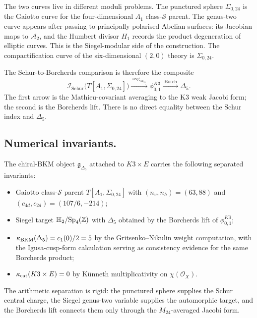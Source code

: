 The two curves live in different moduli problems.  The punctured sphere
$\Sigma_{0,24}$ is the Gaiotto curve for the four-dimensional
$A_1$ class-$\mathcal S$ parent.  The genus-two curve appears after
passing to principally polarised Abelian surfaces: its Jacobian maps to
$\mathcal A_2$, and the Humbert divisor $H_1$ records the product
degeneration of elliptic curves.  This is the Siegel-modular side of
the construction. The compactification curve of the six-dimensional
$(2,0)$ theory is \(\Sigma_{0,24}\).

The Schur-to-Borcherds comparison is therefore the composite
\begin{equation}
  \mathcal I_{\mathrm{Schur}}\big(T[A_1,\Sigma_{0,24}]\big)
  \xrightarrow{\;\operatorname{avg}_{M_{24}}\;}
  \phi^{K3}_{0,1}
  \xrightarrow{\;\mathrm{Borch}\;}
  \Delta_5.
  \label{eq:schur-m24-borcherds-composite}
\end{equation}
The first arrow is the Mathieu-covariant averaging to the K3 weak
Jacobi form; the second is the Borcherds lift.  There is no direct
equality between the Schur index and $\Delta_5$.

\subsection*{Numerical invariants.}

The chiral-BKM object $\mathfrak g_{\Delta_5}$ attached to
$K3\times E$ carries the following separated invariants:
\begin{itemize}\setlength\itemsep{0pt}
  \item Gaiotto class-$\mathcal S$ parent
  $T[A_1,\Sigma_{0,24}]$ with
  $(n_v,n_h)=(63,88)$ and
  $(c_{4d},c_{2d})=(107/6,-214)$;
  \item Siegel target $\mathbb H_2/\mathrm{Sp}_4(\mathbb{Z})$ with
  $\Delta_5$ obtained by the Borcherds lift of $\phi^{K3}_{0,1}$;
  \item $\kappa_{\mathrm{BKM}}(\Delta_5)=c_1(0)/2=5$ by the Gritsenko--Nikulin
  weight computation, with the Igusa-cusp-form calculation serving as
  consistency evidence for the same Borcherds product;
  \item $\kappa_{\mathrm{cat}}(K3\times E)=0$ by K\"unneth multiplicativity on
  $\chi(\mathcal O_X)$.
\end{itemize}

The arithmetic separation is rigid: the punctured sphere supplies the
Schur central charge, the Siegel genus-two variable supplies the
automorphic target, and the Borcherds lift connects them only through
the $M_{24}$-averaged Jacobi form.

